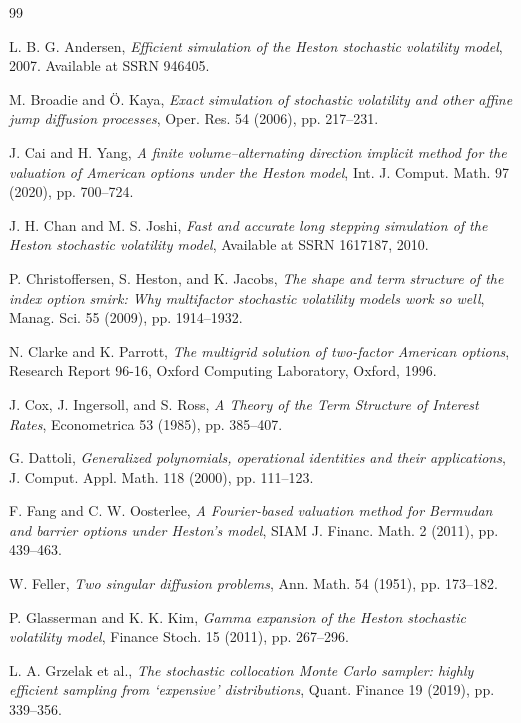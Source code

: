 \documentclass[]{interact}
\theoremstyle{plain}%
\theoremstyle{definition}
\theoremstyle{remark}
\begin{document}
\begin{thebibliography}{99}

L. B. G. Andersen, \emph{Efficient simulation of the Heston stochastic volatility model}, 2007. Available at SSRN 946405.

M. Broadie and \"{O}. Kaya, \emph{Exact simulation of stochastic volatility and other affine jump diffusion processes}, Oper. Res. 54 (2006), pp. 217--231.

J. Cai and H. Yang, \emph{A finite volume--alternating direction implicit method for the valuation of American options under the Heston model}, Int. J. Comput. Math. 97 (2020), pp. 700--724.

J. H. Chan and M. S. Joshi, \emph{Fast and accurate long stepping simulation of the Heston stochastic volatility model}, Available at SSRN 1617187, 2010.

P. Christoffersen, S. Heston, and K. Jacobs, \emph{The shape and term structure of the index option smirk: Why multifactor stochastic volatility models work so well}, Manag. Sci. 55 (2009), pp. 1914--1932.

N. Clarke and K. Parrott, \emph{The multigrid solution of two-factor American options}, Research Report 96-16, Oxford Computing Laboratory, Oxford, 1996.

J. Cox, J. Ingersoll, and S. Ross, \emph{A Theory of the Term Structure of Interest Rates}, Econometrica 53 (1985), pp. 385--407.

G. Dattoli, \emph{Generalized polynomials, operational identities and their applications}, J. Comput. Appl. Math. 118 (2000), pp. 111--123.

F. Fang and C. W. Oosterlee, \emph{A Fourier-based valuation method for Bermudan and barrier options under Heston's model}, SIAM J. Financ. Math. 2 (2011), pp. 439--463.

W. Feller, \emph{Two singular diffusion problems}, Ann. Math. 54 (1951), pp. 173--182.

P. Glasserman and K. K. Kim, \emph{Gamma expansion of the Heston stochastic volatility model}, Finance Stoch. 15 (2011), pp. 267--296.

L. A. Grzelak et al., \emph{The stochastic collocation Monte Carlo sampler: highly efficient sampling from ‘expensive’ distributions}, Quant. Finance 19 (2019), pp. 339--356.


\end{thebibliography}
\end{document}
